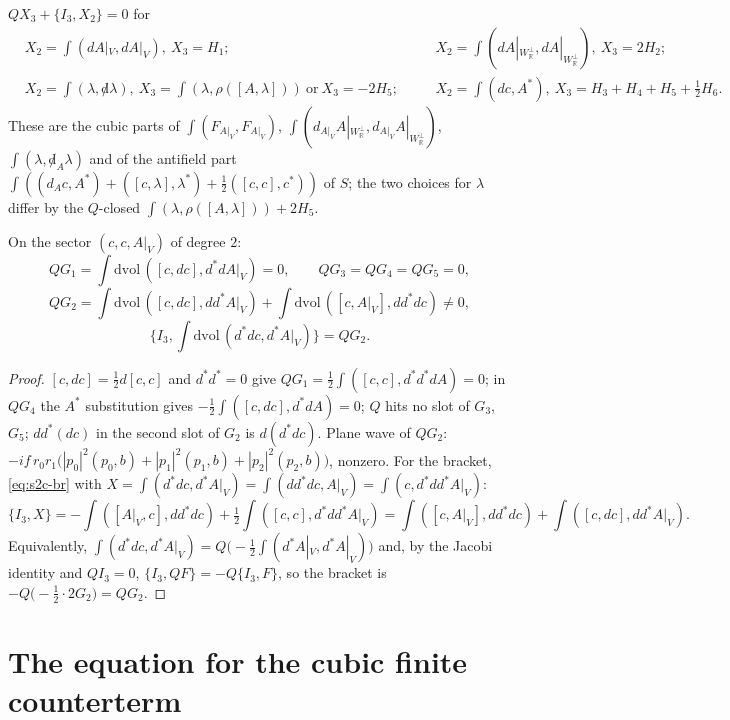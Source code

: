 \begin{corollary}
\label{cor:s2c-completions}
$QX_3+\{I_3,X_2\}=0$ for
\[
\begin{aligned}
&X_2=\int(dA|_V,dA|_V),\ X_3=H_1;&\quad &X_2=\int(dA|_{W_{\mathbb R}^\perp},dA|_{W_{\mathbb R}^\perp}),\ X_3=2H_2;\\
&X_2=\int(\lambda,{\not d}\lambda),\ X_3=\int(\lambda,\rho([A,\lambda]))\ \text{or}\ X_3=-2H_5;&\quad &X_2=\int(dc,A^*),\ X_3=H_3+H_4+H_5+\tfrac12H_6 .
\end{aligned}
\]
These are the cubic parts of $\int(F_{A|_V},F_{A|_V})$, $\int(d_{A|_V}A|_{W_{\mathbb R}^\perp},d_{A|_V}A|_{W_{\mathbb R}^\perp})$, $\int(\lambda,{\not d}_A\lambda)$ and of the antifield part $\int((d_Ac,A^*)+([c,\lambda],\lambda^*)+\tfrac12([c,c],c^*))$ of $S$; the two choices for $\lambda$ differ by the $Q$-closed $\int(\lambda,\rho([A,\lambda]))+2H_5$.
\end{corollary}

\begin{lemma}
\label{lem:s2c-QG}
On the sector $(c,c,A|_V)$ of degree $2$:
\[
QG_1=\int\mathrm{dvol}\,([c,dc],d^*dA|_V)=0,\qquad QG_3=QG_4=QG_5=0,
\]
\[
QG_2=\int\mathrm{dvol}\,([c,dc],dd^*A|_V)+\int\mathrm{dvol}\,([c,A|_V],dd^*dc)\neq0,
\]
\[
\Big\{I_3,\int\mathrm{dvol}\,(d^*dc,d^*A|_V)\Big\}=QG_2 .
\]
\end{lemma}

\begin{proof}
$[c,dc]=\tfrac12d[c,c]$ and $d^*d^*=0$ give $QG_1=\tfrac12\int([c,c],d^*d^*dA)=0$; in $QG_4$ the $A^*$ substitution gives $-\tfrac12\int([c,dc],d^*dA)=0$; $Q$ hits no slot of $G_3$, $G_5$; $dd^*(dc)$ in the second slot of $G_2$ is $d(d^*dc)$. Plane wave of $QG_2$: $-if\,r_0r_1\big(|p_0|^2(p_0,b)+|p_1|^2(p_1,b)+|p_2|^2(p_2,b)\big)$, nonzero. For the bracket, \eqref{eq:s2c-br} with $X=\int(d^*dc,d^*A|_V)=\int(dd^*dc,A|_V)=\int(c,d^*dd^*A|_V)$:
\[
\{I_3,X\}=-\int([A|_V,c],dd^*dc)+\tfrac12\int([c,c],d^*dd^*A|_V)=\int([c,A|_V],dd^*dc)+\int([c,dc],dd^*A|_V).
\]
Equivalently, $\int(d^*dc,d^*A|_V)=Q\big(-\tfrac12\int(d^*A|_V,d^*A|_V)\big)$ and, by the Jacobi identity and $QI_3=0$, $\{I_3,QF\}=-Q\{I_3,F\}$, so the bracket is $-Q\big(-\tfrac12\cdot2G_2\big)=QG_2$.
\end{proof}

\section{The equation for the cubic finite counterterm}

